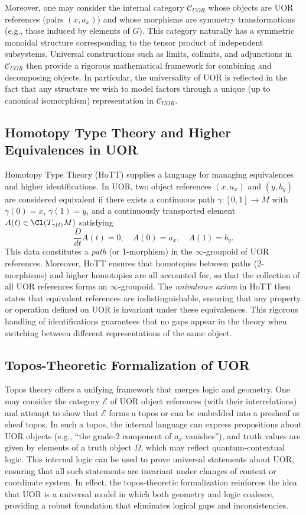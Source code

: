 \documentclass[12pt]{article}
\begin{document}
Moreover, one may consider the internal category $\mathcal{C}_{UOR}$ whose objects are UOR references (pairs $(x,a_x)$) and whose morphisms are symmetry transformations (e.g., those induced by elements of $G$). This category naturally has a symmetric monoidal structure corresponding to the tensor product of independent subsystems. Universal constructions such as limits, colimits, and adjunctions in $\mathcal{C}_{UOR}$ then provide a rigorous mathematical framework for combining and decomposing objects. In particular, the universality of UOR is reflected in the fact that any structure we wish to model factors through a unique (up to canonical isomorphism) representation in $\mathcal{C}_{UOR}$.

\subsection{Homotopy Type Theory and Higher Equivalences in UOR}
Homotopy Type Theory (HoTT) supplies a language for managing equivalences and higher identifications. In UOR, two object references $(x,a_x)$ and $(y,b_y)$ are considered equivalent if there exists a continuous path $\gamma: [0,1] \to M$ with $\gamma(0)=x$, $\gamma(1)=y$, and a continuously transported element $A(t) \in \Cl(T_{\gamma(t)}M)$ satisfying 
\[
\frac{D}{dt} A(t) = 0, \quad A(0)=a_x,\quad A(1)=b_y.
\]
This data constitutes a \emph{path} (or 1-morphism) in the $\infty$-groupoid of UOR references. Moreover, HoTT ensures that homotopies between paths (2-morphisms) and higher homotopies are all accounted for, so that the collection of all UOR references forms an $\infty$-groupoid. The \emph{univalence axiom} in HoTT then states that equivalent references are indistinguishable, ensuring that any property or operation defined on UOR is invariant under these equivalences. This rigorous handling of identifications guarantees that no gaps appear in the theory when switching between different representations of the same object.

\subsection{Topos-Theoretic Formalization of UOR}
Topos theory offers a unifying framework that merges logic and geometry. One may consider the category $\mathcal{E}$ of UOR object references (with their interrelations) and attempt to show that $\mathcal{E}$ forms a topos or can be embedded into a presheaf or sheaf topos. In such a topos, the internal language can express propositions about UOR objects (e.g., ``the grade-2 component of $a_x$ vanishes''), and truth values are given by elements of a truth object $\Omega$, which may reflect quantum-contextual logic. This internal logic can be used to prove universal statements about UOR, ensuring that all such statements are invariant under changes of context or coordinate system. In effect, the topos-theoretic formalization reinforces the idea that UOR is a universal model in which both geometry and logic coalesce, providing a robust foundation that eliminates logical gaps and inconsistencies.
\end{document}
